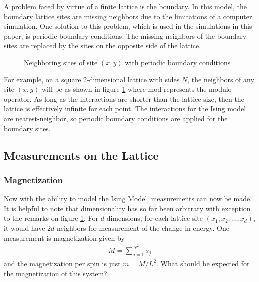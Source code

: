 \documentclass[11pt]{article}
\begin{document}
A problem faced by virtue of a finite lattice is the boundary. In this model, the boundary lattice sites are missing neighbors due to the limitations of a computer simulation. One solution to this problem, which is used in the simulations in this paper, is periodic boundary conditions. The missing neighbors of the boundary sites are replaced by the sites on the opposite side of the lattice.

\begin{figure}[ht]
\centering
{}
\caption{Neighboring sites of site $(x,y)$ with periodic boundary conditions} \label{fig:PBC}
\end{figure}

For example, on a square 2-dimensional lattice with sides $N$, the neighbors of any site $(x,y)$ will be as shown in figure \ref{fig:PBC} where mod represents the modulo operator. As long as the interactions are shorter than the lattice size, then the lattice is effectively infinite for each point. The interactions for the Ising model are nearest-neighbor, so periodic boundary conditions are applied for the boundary sites.

\subsection{Measurements on the Lattice}
\subsubsection{Magnetization}
Now with the ability to model the Ising Model, measurements can now be made. It is helpful to note that dimensionality has so far been arbitrary with exception to the remarks on figure \ref{fig:PBC}. For $d$ dimensions, for each lattice site $(x_1,x_2,\ldots,x_d)$, it would have $2d$ neighbors for measurement of the change in energy. One measurement is magnetization given by
\begin{align}
	M=\sum^{N^2}_{j=1}s_j
\end{align}
and the magnetization per spin is just $m=M/L^2$. What should be expected for the magnetization of this system?
\end{document}
